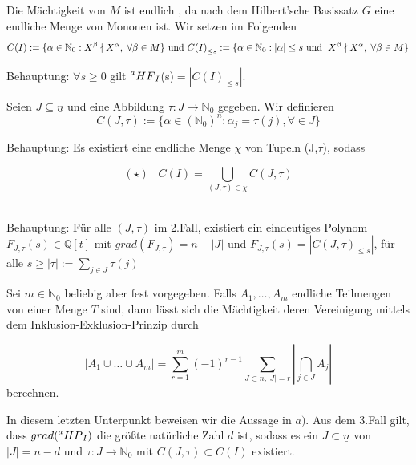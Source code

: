 \documentclass{article}
\newcommand*{\indx}[2]{{#1}_{#2}}
\newcommand*{\potx}[2]{{#1}^{#2}}
\newcommand*{\N}{\mathbb{N}_0}
\newcommand*{\hf}[1]{$\prescript{a}{}{HF}_{#1}$}
\newcommand*{\hp}[1]{$\prescript{a}{}{HP}_{#1}$}
\begin{document}
Die Mächtigkeit von $M$ ist endlich , da nach dem Hilbert'sche Basissatz $G$ eine endliche Menge von Mononen ist.
Wir setzen im Folgenden 
\begin{displaymath}
C(I):=\{\alpha \in \N: \potx{X}{\beta} \nmid \potx{X}{\alpha},\; \forall \beta \in M \}
\textnormal{ und } 
\indx{C(I)}{\leq s}:= \{\alpha \in \N:|\alpha|\leq s \textnormal{ und } \; \potx{X}{\beta} \nmid \potx{X}{\alpha},\; \forall \beta \in M \}
\end{displaymath}

\begin{compactenum}
\item Behauptung: $\forall s\geq 0$ gilt \hf{I}(s)$=|\indx{C(I)}{\leq s}|$.\\
\item Seien $J\subseteq \underline{n}$ und eine Abbildung $\tau:J\longrightarrow \N$ gegeben. Wir definieren
\begin{displaymath}
C(J,\tau):=\{\alpha \in (\N)^n: \indx{\alpha}{j}=\tau(j), \forall \in J  \}
\end{displaymath}

Behauptung: Es existiert eine endliche Menge $\chi$ von Tupeln (J,$\tau$), sodass 

\begin{displaymath}
(\star)\;\;\;   C(I)=\bigcup\limits_{(J,\tau)\in \chi} C(J,\tau)  
\end{displaymath}
\\
\item Behauptung: Für alle $(J,\tau)$ im 2.Fall, existiert ein eindeutiges Polynom $\indx{F}{J,\tau}(s)\in \mathbb{Q}[t]$ mit $grad(\indx{F}{J,\tau})=n-|J|$ und
$\indx{F}{J,\tau}(s)=\left|\indx{C(J,\tau)}{\leq s}\right|$, für alle $s\geq |\tau|:=\sum\limits_{j\in J}\tau(j)$\\
\item Sei $m\in\N$ beliebig aber fest vorgegeben. Falls $\indx{A}{1},\ldots,\indx{A}{m}$ endliche Teilmengen von einer Menge $T$ sind, dann lässt sich die Mächtigkeit deren Vereinigung mittels dem Inklusion-Exklusion-Prinzip durch

\begin{displaymath}
\left|\indx{A}{1}\cup\ldots\cup\indx{A}{m}\right|=\sum\limits_{r=1}^{m}(-1)^{r-1}\sum\limits_{J\subset\underline{n},\left|J\right|=r}{|\bigcap\limits_{j\in J}\indx{A}{j}|}
\end{displaymath}
berechnen.\\
\item In diesem letzten Unterpunkt beweisen wir die Aussage in $a)$. Aus dem 3.Fall gilt, dass $grad(\textnormal{\hp{I}})$ die größte natürliche Zahl $d$ ist, sodass es ein $J\subset\underline{n}$ von $|J|=n-d$ und $\tau: J\rightarrow\N$ mit $C(J,\tau)\subset C(I)$  existiert. 


\end{compactenum}
\end{document}
